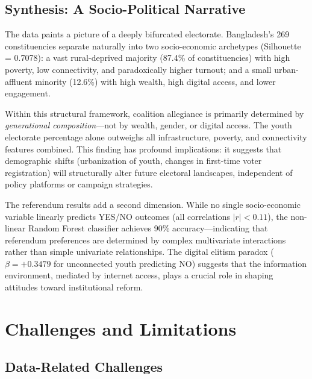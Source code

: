 \documentclass[12pt, a4paper]{article}
\begin{document}
\subsection{Synthesis: A Socio-Political Narrative}

The data paints a picture of a deeply bifurcated electorate. Bangladesh's 269 constituencies separate naturally into two socio-economic archetypes (Silhouette = 0.7078): a vast rural-deprived majority (87.4\% of constituencies) with high poverty, low connectivity, and paradoxically higher turnout; and a small urban-affluent minority (12.6\%) with high wealth, high digital access, and lower engagement.

Within this structural framework, coalition allegiance is primarily determined by \emph{generational composition}---not by wealth, gender, or digital access. The youth electorate percentage alone outweighs all infrastructure, poverty, and connectivity features combined. This finding has profound implications: it suggests that demographic shifts (urbanization of youth, changes in first-time voter registration) will structurally alter future electoral landscapes, independent of policy platforms or campaign strategies.

The referendum results add a second dimension. While no single socio-economic variable linearly predicts YES/NO outcomes (all correlations $|r| < 0.11$), the non-linear Random Forest classifier achieves 90\% accuracy---indicating that referendum preferences are determined by complex multivariate interactions rather than simple univariate relationships. The digital elitism paradox ($\beta = +0.3479$ for unconnected youth predicting NO) suggests that the information environment, mediated by internet access, plays a crucial role in shaping attitudes toward institutional reform.

\section{Challenges and Limitations}

\subsection{Data-Related Challenges}
\end{document}
